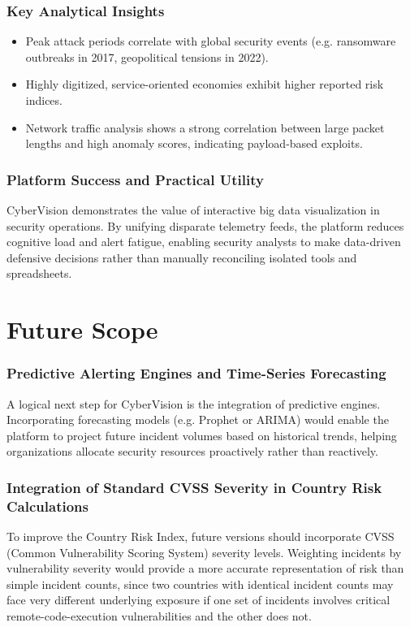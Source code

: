\documentclass[a4paper, 12pt]{report}
\begin{document}
\subsection{Key Analytical Insights}
\begin{itemize}
    \item Peak attack periods correlate with global security events (e.g. ransomware outbreaks in 2017, geopolitical tensions in 2022).
    \item Highly digitized, service-oriented economies exhibit higher reported risk indices.
    \item Network traffic analysis shows a strong correlation between large packet lengths and high anomaly scores, indicating payload-based exploits.
\end{itemize}

\subsection{Platform Success and Practical Utility}
CyberVision demonstrates the value of interactive big data visualization in security operations. By unifying disparate telemetry feeds, the platform reduces cognitive load and alert fatigue, enabling security analysts to make data-driven defensive decisions rather than manually reconciling isolated tools and spreadsheets.

\chapter{Future Scope}

\subsection{Predictive Alerting Engines and Time-Series Forecasting}
A logical next step for CyberVision is the integration of predictive engines. Incorporating forecasting models (e.g. Prophet or ARIMA) would enable the platform to project future incident volumes based on historical trends, helping organizations allocate security resources proactively rather than reactively.

\subsection{Integration of Standard CVSS Severity in Country Risk Calculations}
To improve the Country Risk Index, future versions should incorporate CVSS (Common Vulnerability Scoring System) severity levels. Weighting incidents by vulnerability severity would provide a more accurate representation of risk than simple incident counts, since two countries with identical incident counts may face very different underlying exposure if one set of incidents involves critical remote-code-execution vulnerabilities and the other does not.
\end{document}
